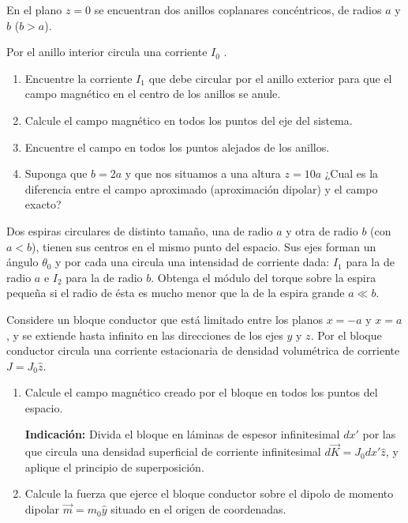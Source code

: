 \bigbreak

\np
En el plano $z = 0$ se encuentran dos anillos coplanares concéntricos, de radios $a$ y $b$ ($b > a$). 


Por el anillo interior circula una corriente $I_0$ .

\begin{enumerate}
	\item Encuentre la corriente $I_1$ que debe circular por el anillo exterior para que el campo magnético en el centro de los anillos se anule.
	\item Calcule el campo magnético en todos los puntos del eje del sistema.
	\item Encuentre el campo en todos los puntos alejados de los anillos.
	\item Suponga que $b = 2a$ y que nos situamos a una altura $z = 10a$ ¿Cual es la diferencia entre el campo aproximado (aproximación dipolar) y el campo exacto?
\end{enumerate}

\newpage

\np
Dos espiras circulares de distinto tamaño, una de radio $a$ y otra de radio $b$ (con $a < b$), tienen sus centros en el mismo punto del espacio. Sus ejes forman un ángulo $\theta_0$ y por cada una circula una intensidad de corriente dada: $I_1$ para la de radio $a$ e $I_2$ para la de radio $b$. Obtenga el módulo del torque sobre la espira pequeña si el radio de ésta es mucho menor que la de la espira grande $a \ll b$.

\bigbreak

\np
Considere un bloque conductor que está limitado entre los planos $x = -a$ y $x = a$, y se extiende hasta inﬁnito en las direcciones de los ejes $y$ y $z$. Por el bloque conductor circula una corriente estacionaria de densidad volumétrica de corriente $J = J_0\hat z$.

\begin{enumerate}
	\item Calcule el campo magnético creado por el bloque en todos los puntos del espacio.
	
	
	\textbf{Indicación:} Divida el bloque en láminas de espesor inﬁnitesimal $dx'$ por las que circula una densidad superﬁcial de corriente inﬁnitesimal $d\vec K = J_0 dx' \hat z$, y aplique el principio de superposición.
	\item Calcule la fuerza que ejerce el bloque conductor sobre el dipolo de momento dipolar $\vec m = m_0 \hat y$ situado en el origen de coordenadas.
\end{enumerate}

